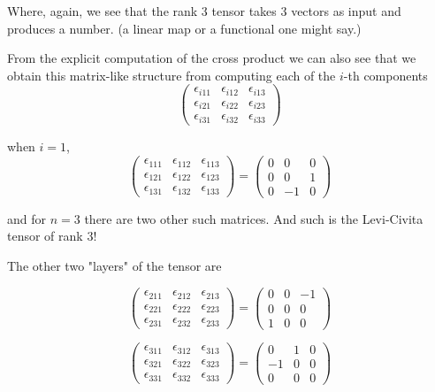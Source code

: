 Where, again, we see that the rank 3 tensor takes 3 vectors as input and produces a number.
(a linear map or a functional one might say.)

From the explicit computation of the cross product we can also see that we obtain this matrix-like
structure from computing each of the $i$-th components
$$
\begin{pmatrix}
\epsilon_{i11} & \epsilon_{i12} & \epsilon_{i13} \\
\epsilon_{i21} & \epsilon_{i22} & \epsilon_{i23} \\
\epsilon_{i31} & \epsilon_{i32} & \epsilon_{i33}
\end{pmatrix}
$$

when $i=1$,
$$
\begin{pmatrix}
\epsilon_{111} & \epsilon_{112} & \epsilon_{113} \\
\epsilon_{121} & \epsilon_{122} & \epsilon_{123} \\
\epsilon_{131} & \epsilon_{132} & \epsilon_{133}
\end{pmatrix}
=
\begin{pmatrix}
0 & 0 & 0 \\
0 & 0 & 1 \\
0 & -1 & 0
\end{pmatrix}
$$

and for $n=3$ there are two other such matrices.
And such is the Levi-Civita tensor of rank 3!

The other two "layers" of the tensor are

$$
\begin{pmatrix}
\epsilon_{211} & \epsilon_{212} & \epsilon_{213} \\
\epsilon_{221} & \epsilon_{222} & \epsilon_{223} \\
\epsilon_{231} & \epsilon_{232} & \epsilon_{233}
\end{pmatrix}
=
\begin{pmatrix}
0 & 0 & -1 \\
0 & 0 & 0 \\
1 & 0 & 0
\end{pmatrix}
$$

$$
\begin{pmatrix}
\epsilon_{311} & \epsilon_{312} & \epsilon_{313} \\
\epsilon_{321} & \epsilon_{322} & \epsilon_{323} \\
\epsilon_{331} & \epsilon_{332} & \epsilon_{333}
\end{pmatrix}
=
\begin{pmatrix}
0 & 1 & 0 \\
-1 & 0 & 0 \\
0 & 0 & 0
\end{pmatrix}
$$

